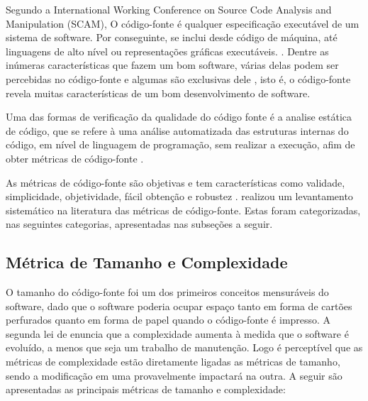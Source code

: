Segundo a International Working Conference on Source Code Analysis and 
Manipulation (SCAM), O código-fonte é qualquer especificação executável 
de um sistema de software. Por conseguinte, se inclui desde código de máquina, 
até linguagens de alto nível ou representações gráficas executáveis. 
\cite{harman2010source}. Dentre as inúmeras características que fazem um bom software, várias delas podem ser percebidas no código-fonte e algumas são exclusivas dele \cite{Meirelles2013}, isto é, o código-fonte revela muitas características de um bom desenvolvimento de software.
 
Uma das formas de verificação da qualidade do código fonte é a analise estática de código, que se refere à uma análise automatizada das estruturas internas do código, em nível de linguagem de programação, sem realizar a execução, afim de obter métricas de código-fonte \cite{Terra2008} 
\cite{Emanuelsson2008} \cite{Wichmann95}  \cite{Nielson:1999} 
\cite{Sommerville10}. 

As métricas de código-fonte são objetivas e tem características como validade, simplicidade, objetividade, fácil obtenção e robustez \cite{Mills:1999}.  realizou um levantamento sistemático na literatura das métricas de código-fonte. Estas foram categorizadas, nas seguintes categorias, apresentadas nas subseções a seguir. 


\subsection{Métrica de Tamanho e Complexidade}

\label{métricas tamanho e complexidade} 

O tamanho do código-fonte foi um dos primeiros conceitos mensuráveis do 
software, dado que o software poderia ocupar espaço tanto em forma de cartões 
perfurados quanto em forma de papel quando o código-fonte é impresso. 
A segunda lei de  enuncia que a complexidade aumenta à 
medida que o software é evoluído, a menos que seja um trabalho de manutenção. 
Logo é perceptível que as métricas de complexidade estão diretamente ligadas as 
métricas de tamanho, sendo a modificação em uma provavelmente impactará na 
outra. A seguir são apresentadas as principais métricas de tamanho e 
complexidade:


